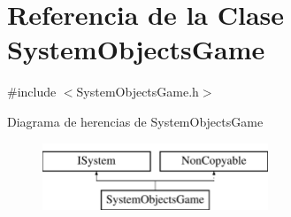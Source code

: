 \hypertarget{classSystemObjectsGame}{}\section{Referencia de la Clase System\+Objects\+Game}
\label{classSystemObjectsGame}


{\ttfamily \#include $<$System\+Objects\+Game.\+h$>$}

Diagrama de herencias de System\+Objects\+Game\begin{figure}[H]
\begin{center}
\leavevmode
\includegraphics[height=2.000000cm]{classSystemObjectsGame}
\end{center}
\end{figure}

